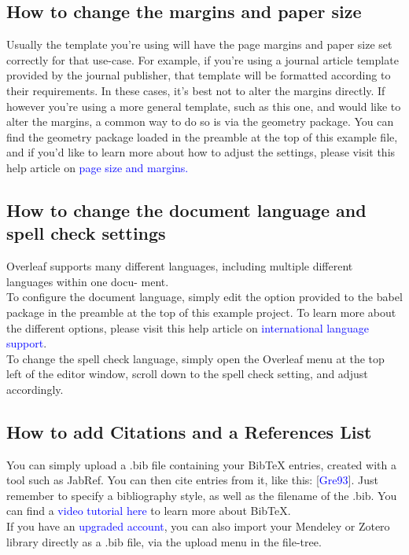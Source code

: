 \documentclass{article}
\begin{document}
\subsection{How to change the margins and paper size}
Usually the template you’re using will have the page margins and paper size set correctly for that
use-case. For example, if you’re using a journal article template provided by the journal publisher,
that template will be formatted according to their requirements. In these cases, it’s best not to alter
the margins directly.
If however you’re using a more general template, such as this one, and would like to alter the
margins, a common way to do so is via the geometry package. You can find the geometry package
loaded in the preamble at the top of this example file, and if you’d like to learn more about how to
adjust the settings, please visit this help article on {\textcolor{blue}{page size and margins.}}

\subsection{How to change the document language and spell check settings}

Overleaf supports many different languages, including multiple different languages within one docu-
ment.\\
To configure the document language, simply edit the option provided to the babel package in the
preamble at the top of this example project. To learn more about the different options, please visit
this help article on {\textcolor{blue}{international language support}}.\\
To change the spell check language, simply open the Overleaf menu at the top left of the editor
window, scroll down to the spell check setting, and adjust accordingly.



\subsection{How to add Citations and a References List}
You can simply upload a .bib file containing your BibTeX entries, created with a tool such as JabRef.
You can then cite entries from it, like this: [{\textcolor{blue}{Gre93}}]. Just remember to specify a bibliography style, as
well as the filename of the .bib. You can find a {\textcolor{blue}{video tutorial here}} to learn more about BibTeX.\\
 \hspace{1cm} If you have an {\textcolor{blue}{upgraded account}}, you can also import your Mendeley or Zotero library directly as
a .bib file, via the upload menu in the file-tree.
\end{document}
